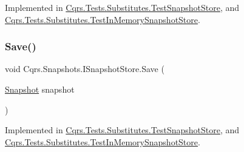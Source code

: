 Implemented in \hyperlink{classCqrs_1_1Tests_1_1Substitutes_1_1TestSnapshotStore_a8f07b513e21a7ed7ea0f52a41c9586ba_a8f07b513e21a7ed7ea0f52a41c9586ba}{Cqrs.\+Tests.\+Substitutes.\+Test\+Snapshot\+Store}, and \hyperlink{classCqrs_1_1Tests_1_1Substitutes_1_1TestInMemorySnapshotStore_a4e149196381a80cc9c53cdbb67b8dcaa_a4e149196381a80cc9c53cdbb67b8dcaa}{Cqrs.\+Tests.\+Substitutes.\+Test\+In\+Memory\+Snapshot\+Store}.

\mbox{\label{interfaceCqrs_1_1Snapshots_1_1ISnapshotStore_a6e99c620115ce8a0648a83bf2ce05527_a6e99c620115ce8a0648a83bf2ce05527}} 
\subsubsection{\texorpdfstring{Save()}{Save()}}
{\footnotesize\ttfamily void Cqrs.\+Snapshots.\+I\+Snapshot\+Store.\+Save (\begin{DoxyParamCaption}\item[{\hyperlink{classCqrs_1_1Snapshots_1_1Snapshot}{Snapshot}}]{snapshot }\end{DoxyParamCaption})}



Implemented in \hyperlink{classCqrs_1_1Tests_1_1Substitutes_1_1TestSnapshotStore_a223dbc9583120dec1469c1f84b863eae_a223dbc9583120dec1469c1f84b863eae}{Cqrs.\+Tests.\+Substitutes.\+Test\+Snapshot\+Store}, and \hyperlink{classCqrs_1_1Tests_1_1Substitutes_1_1TestInMemorySnapshotStore_afec5ba3ed2b39625b3ccfb002d1c935e_afec5ba3ed2b39625b3ccfb002d1c935e}{Cqrs.\+Tests.\+Substitutes.\+Test\+In\+Memory\+Snapshot\+Store}.

